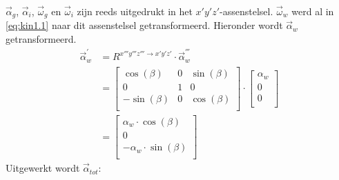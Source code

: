 $\vec{\alpha}_{g}$, $\vec{\alpha}_{i}$, $\vec{\omega}_{g}$ en $\vec{\omega}_{i}$ zijn reeds uitgedrukt in het $x'y'z'$-assenstelsel. $\vec{\omega}_{w}$ werd al in \eqref{eq:kin1.1} naar dit assenstelsel getransformeerd. Hieronder wordt $\vec{\alpha}_{w}$ getransformeerd.
\begin{equation}
\begin{split}
\vec{\alpha}_{w}^{'}&=R^{x'''y'''z''' \rightarrow x'y'z'} \cdot \vec{\alpha}_{w}^{'''}\\
&=\begin{bmatrix}
\cos(\beta)	&			0			&\sin(\beta)\\
0						&			1			&			0		 \\
-\sin(\beta)&			0			&\cos(\beta)\\
\end{bmatrix}
\cdot
\begin{bmatrix}
\alpha_{w}	\\
0						\\
0						\\
\end{bmatrix}\\
&=
\begin{bmatrix}
\alpha_{w}\cdot \cos(\beta)	\\
0						\\
-\alpha_{w}\cdot \sin(\beta)	\\
\end{bmatrix}
\end{split}
\label{eq:kin1.7}
\end{equation}
Uitgewerkt wordt $\vec{\alpha}_{tot}$:
